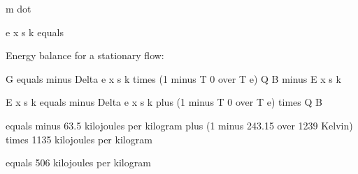 m dot

e x s k equals

Energy balance for a stationary flow:

G equals minus Delta e x s k times (1 minus T 0 over T e) Q B minus E x s k

E x s k equals minus Delta e x s k plus (1 minus T 0 over T e) times Q B

equals minus 63.5 kilojoules per kilogram plus (1 minus 243.15 over 1239 Kelvin) times 1135 kilojoules per kilogram

equals 506 kilojoules per kilogram